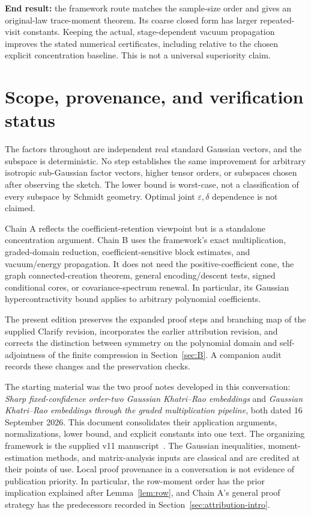 \documentclass[11pt]{article}
\numberwithin{equation}{section}
\theoremstyle{definition}\newtheorem{definition}[theorem]{Definition}
\theoremstyle{remark}\newtheorem{remark}[theorem]{Remark}
\begin{document}
\begin{takeaway}
\textbf{End result:} the framework route matches the sample-size order and gives
an original-law trace-moment theorem. Its coarse closed form has larger
repeated-visit constants. Keeping the actual, stage-dependent vacuum propagation
improves the stated numerical certificates, including relative to the chosen
explicit concentration baseline. This is not a universal superiority claim.
\end{takeaway}

\section{Scope, provenance, and verification status}\label{sec:scope}
The factors throughout are independent real standard Gaussian vectors, and the
subspace is deterministic. No step establishes the same improvement for arbitrary
isotropic sub-Gaussian factor vectors, higher tensor orders, or subspaces chosen
after observing the sketch. The lower bound is worst-case, not a classification
of every subspace by Schmidt geometry. Optimal joint $\varepsilon,\delta$
dependence is not claimed.

Chain A reflects the coefficient-retention viewpoint but is a standalone
concentration argument. Chain B uses the framework's exact multiplication,
graded-domain reduction, coefficient-sensitive block estimates, and vacuum/energy
propagation. It does not need the positive-coefficient cone, the graph
connected-creation theorem, general encoding/descent tests, signed conditional
cores, or covariance-spectrum renewal. In particular, its Gaussian
hypercontractivity bound applies to arbitrary polynomial coefficients.

The present edition preserves the expanded proof steps and branching map of
the supplied Clarify revision, incorporates the earlier attribution revision,
and corrects the distinction between symmetry on the polynomial domain and
self-adjointness of the finite compression in Section~\ref{sec:B}.
A companion audit records these changes and the preservation checks.

The starting material was the two proof notes developed in this conversation:
\emph{Sharp fixed-confidence order-two Gaussian Khatri--Rao embeddings} and
\emph{Gaussian Khatri--Rao embeddings through the graded multiplication pipeline},
both dated 16 September 2026. This document consolidates their application
arguments, normalizations, lower bound, and explicit constants into one text.
The organizing framework is the supplied v11 manuscript~\cite{Framework}.
The Gaussian inequalities, moment-estimation methods, and matrix-analysis inputs
are classical and are credited at their points of use. Local proof provenance
in a conversation is not evidence of publication priority. In particular, the
row-moment order has the prior implication explained after Lemma~\ref{lem:row},
and Chain A's general proof strategy has the predecessors recorded in
Section~\ref{sec:attribution-intro}.
\end{document}
